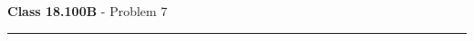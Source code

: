 \documentclass[11pt,reqno]{article}
\begin{document}
\vspace{15pt}
\begin{flushleft} 
\textbf{Class 18.100B} - Problem 7\\
\rule{500pt}{1pt}\\
\end{flushleft} 

\end{document}
